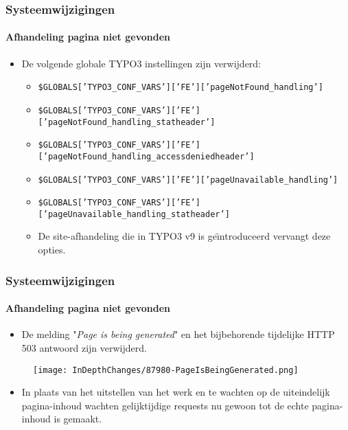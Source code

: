 \begin{frame}[fragile]
	\frametitle{Systeemwijzigingen}
	\framesubtitle{Afhandeling pagina niet gevonden}

	\begin{itemize}

		\item De volgende globale TYPO3 instellingen zijn verwijderd:

			\begin{itemize}
				\item {\fontsize{7}{8}\selectfont\texttt{\$GLOBALS['TYPO3\_CONF\_VARS']['FE']['pageNotFound\_handling']}}
				\item {\fontsize{7}{8}\selectfont\texttt{\$GLOBALS['TYPO3\_CONF\_VARS']['FE']['pageNotFound\_handling\_statheader']}}
				\item {\fontsize{7}{8}\selectfont\texttt{\$GLOBALS['TYPO3\_CONF\_VARS']['FE']['pageNotFound\_handling\_accessdeniedheader']}}
				\item {\fontsize{7}{8}\selectfont\texttt{\$GLOBALS['TYPO3\_CONF\_VARS']['FE']['pageUnavailable\_handling']}}
				\item {\fontsize{7}{8}\selectfont\texttt{\$GLOBALS['TYPO3\_CONF\_VARS']['FE']['pageUnavailable\_handling\_statheader']}}
			\end{itemize}

			\begin{itemize}\smaller
				\item[\ding{228}] De site-afhandeling die in TYPO3 v9 is ge\"{\i}ntroduceerd vervangt deze opties.
			\end{itemize}\normalsize

	\end{itemize}

\end{frame}


\begin{frame}[fragile]
	\frametitle{Systeemwijzigingen}
	\framesubtitle{Afhandeling pagina niet gevonden}

	\begin{itemize}

		\item De melding "\textit{Page is being generated}" en het bijbehorende tijdelijke
			HTTP 503 antwoord zijn verwijderd.
	\end{itemize}

	\begin{figure}
		\texttt{[image: InDepthChanges/87980-PageIsBeingGenerated.png]}
	\end{figure}

	\begin{itemize}
		\item In plaats van het uitstellen van het werk en te wachten op de uiteindelijk pagina-inhoud wachten
			gelijktijdige requests nu gewoon tot de echte pagina-inhoud is gemaakt.
	\end{itemize}

\end{frame}

